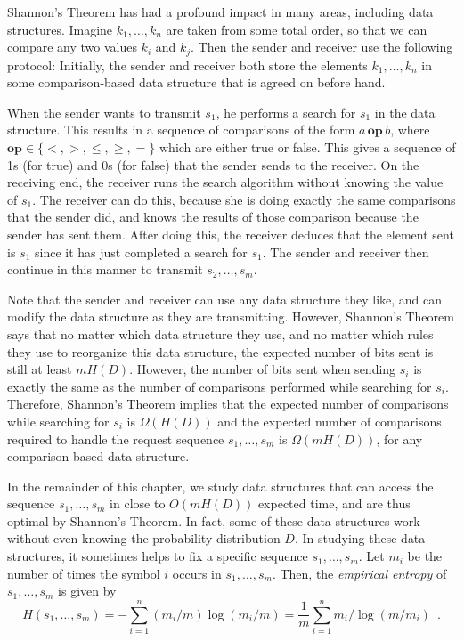 Shannon's Theorem has had a profound impact in many areas, including
data structures.  Imagine $k_1,\ldots,k_n$ are taken from some total
order, so that we can compare any two values $k_i$ and $k_j$.  Then
the sender and receiver use the following protocol: Initially, the
sender and receiver both store the elements $k_1,\ldots,k_n$ in some
comparison-based data structure that is agreed on before hand.

When the sender wants to transmit $s_1$, he performs a search for $s_1$
in the data structure.  This results in a sequence of comparisons of the
form $a\,\mathbf{op}\, b$, where $\mathbf{op}\in\{<,>,\le,\ge,=\}$ which are either true
or false.  This gives a sequence of 1s (for true) and 0s (for false) that
the sender sends to the receiver.  On the receiving end, the receiver runs
the search algorithm without knowing the value of $s_1$.  The receiver
can do this, because she is doing exactly the same comparisons that the
sender did, and knows the results of those comparison because the sender
has sent them.  After doing this, the receiver deduces that the element
sent is $s_1$ since it has just completed a search for $s_1$.  The sender
and receiver then continue in this manner to transmit $s_2,\ldots,s_m$.

Note that the sender and receiver can use any data structure they
like, and can modify the data structure as they are transmitting.
However, Shannon's Theorem says that no matter which data structure
they use, and no matter which rules they use to reorganize this data
structure, the expected number of bits sent is still at least $mH(D)$.
However, the number of bits sent when sending $s_i$ is exactly the
same as the number of comparisons performed while searching for $s_i$.
Therefore, Shannon's Theorem implies that the expected number of
comparisons while searching for $s_i$ is $\Omega(H(D))$ and the
expected number of comparisons required to handle the request sequence
$s_1,\ldots,s_m$ is $\Omega(mH(D))$, for any comparison-based data
structure.

In the remainder of this chapter, we study data structures that can
access the sequence $s_1,\ldots,s_m$ in close to $O(mH(D))$ expected time,
and are thus optimal by Shannon's Theorem.  In fact, some of these data
structures work without even knowing the probability distribution $D$. In
studying these data structures, it sometimes helps to fix a specific
sequence $s_1,\ldots,s_m$. Let $m_i$ be the number of times the symbol
$i$ occurs in $s_1,\ldots,s_m$.  Then, the \emph{empirical entropy}
of $s_1,\ldots,s_m$ is given by
\[
  H(s_1,\ldots,s_m) = -\sum_{i=1}^n (m_i/m)\log (m_i/m) = \frac{1}{m}\sum_{i=1}^n m_i/\log (m/m_i) \enspace .
\]

